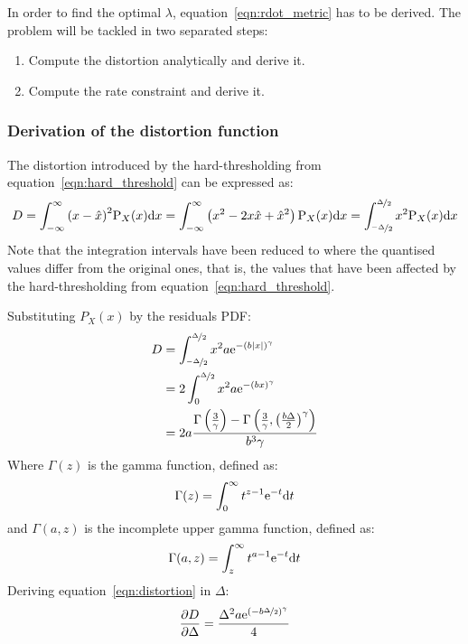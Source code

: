 \documentclass[11pt,a4paper,openright,twoside]{book}
\numberwithin{equation}{section} %
\begin{document}
In order to find the optimal $\lambda$, equation~\ref{eqn:rdot_metric}
has to be derived.
The problem will be tackled in two separated steps:
\begin{enumerate}
	\item Compute the distortion analytically and derive it.
	\item Compute the rate constraint and derive it.
\end{enumerate}

\subsubsection{Derivation of the distortion function}
\label{ssub:derivation_of_the_distortion_function}

The distortion introduced by the hard-thresholding from
equation~\ref{eqn:hard_threshold} can be expressed as:
\begin{equation}
	D
	= \int_{-\infty}^{\infty} {(x - \hat x)}^2 \text{P}_X (x)\text{d} x
	= \int_{-\infty}^{\infty} \left(x^2 -2x\hat x + {\hat x}^2\right) \text{P}_X (x)\text{d} x
	= \int_{\nicefrac{-\Delta}{2}}^{\nicefrac{\Delta}{2}}
	x^2\text{P}_X (x) \text{d} x
\end{equation}
Note that the integration intervals have been reduced to where the
quantised values differ from the original ones, that is, the values that
have been affected by the hard-thresholding from
equation~\ref{eqn:hard_threshold}.

Substituting $P_X(x)$ by the residuals \ac{PDF}:
\begin{align}
	D
	&=\int_{\nicefrac{-\Delta}{2}}^{\nicefrac{\Delta}{2}}
	x^2 a \text{e}^{-{\left(b\vert x \vert\right)}^\gamma} \\
	&=2 \int_0^{\nicefrac{\Delta}{2}}
	x^2 a \text{e}^{-{\left(b x \right)}^\gamma} \\
	&=
		2a \frac{\Gamma\left(\frac{3}{\gamma}\right)-
		\Gamma\left(
		\frac{3}{\gamma},{\left(\frac{b\Delta}{2}\right)}^\gamma
		\right)}{b^3\gamma}
	\label{eqn:distortion}
\end{align}
Where $\Gamma(z)$ is the gamma function, defined as:
\begin{equation}
	\Gamma(z) = \int_0^\infty t^{z-1}\text{e}^{-t}\text{d} t
\end{equation}
and $\Gamma(a,z)$ is the incomplete upper gamma function, defined as:
\begin{equation}
	\Gamma(a,z)=\int_z^\infty t^{a-1}\text{e}^{-t}\text{d} t
\end{equation}
Deriving equation~\ref{eqn:distortion} in $\Delta$:
\begin{equation}
	\frac{\partial D}{\partial\Delta} =
	\frac{\Delta^2 a \text{e}^{{(-b\nicefrac{\Delta}{2})}^\gamma}}{4}
\end{equation}
\end{document}
